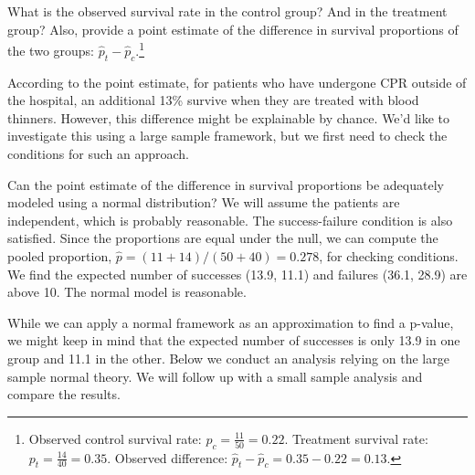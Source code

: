 \begin{exercise}
What is the observed survival rate in the control group? And in the treatment group? Also, provide a point estimate of the difference in survival proportions of the two groups: $\hat{p}_t - \hat{p}_c$.\footnote{Observed control survival rate: $p_c = \frac{11}{50} = 0.22$. Treatment survival rate: $p_t = \frac{14}{40} = 0.35$. Observed difference: $\hat{p}_t - \hat{p}_c = 0.35 - 0.22 = 0.13$.}
\end{exercise}

According to the point estimate, for patients who have undergone CPR outside of the hospital, an additional 13\% survive when they are treated with blood thinners. However, this difference might be explainable by chance. We'd like to investigate this using a large sample framework, but we first need to check the conditions for such an approach.

\begin{example}{Can the point estimate of the difference in survival proportions be adequately modeled using a normal distribution?}
We will assume the patients are independent, which is probably reasonable. The success-failure condition is also satisfied. Since the proportions are equal under the null, we can compute the pooled proportion, $\hat{p} = (11+14)/(50+40) = 0.278$, for checking conditions. We find the expected number of successes (13.9, 11.1) and failures (36.1, 28.9) are above 10. The normal model is reasonable.
\end{example}

While we can apply a normal framework as an approximation to find a p-value, we might keep in mind that the expected number of successes is only 13.9 in one group and 11.1 in the other. Below we conduct an analysis relying on the large sample normal theory. We will follow up with a small sample analysis and compare the results.

